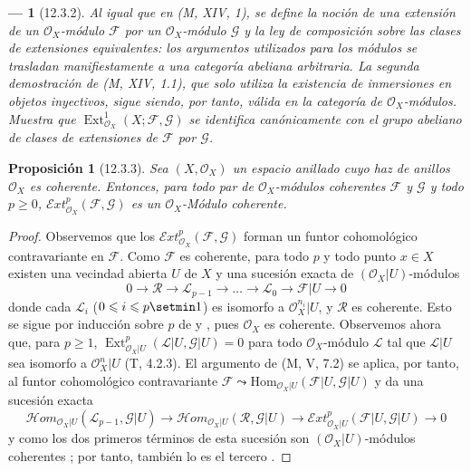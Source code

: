 \documentclass[10pt,oneside,openany]{book}
\theoremstyle{egaenv}\newtheorem*{env}{---}
\theoremstyle{egastatement}
\newtheorem*{proposition}{Proposición}
\theoremstyle{egadescription}
\renewcommand{\leq}{\leqslant}
\renewcommand{\geq}{\geqslant}
\begin{document}
\begin{env}[12.3.2]
\label{0.12.3.2}
\label{0.12.3.2-fr}
Al igual que en (M, XIV, 1), se define la noción de una
\emph{extensión} de un $\mathcal O_X$-módulo $\mathcal F$ por un
$\mathcal O_X$-módulo $\mathcal G$ y la ley de composición sobre las clases de
extensiones equivalentes: los argumentos utilizados para los módulos se
trasladan manifiestamente a una categoría abeliana arbitraria.
La segunda demostración de (M, XIV, 1.1), que solo utiliza la existencia de
inmersiones en objetos inyectivos, sigue siendo, por tanto, válida en la
categoría de $\mathcal O_X$-módulos.  Muestra que
$\operatorname{Ext}_{\mathcal O_X}^1(X;\mathcal F,\mathcal G)$
se identifica canónicamente con el \emph{grupo abeliano de clases de
extensiones de $\mathcal F$ por $\mathcal G$}.
\end{env}

\begin{proposition}[12.3.3]
\label{0.12.3.3}
\label{0.12.3.3-fr}
Sea $(X,\mathcal O_X)$ un espacio anillado cuyo haz de anillos
$\mathcal O_X$ es coherente.
Entonces, para todo par de $\mathcal O_X$-módulos coherentes $\mathcal F$ y
$\mathcal G$ y todo $p\geq0$,
$\mathcal{E}xt_{\mathcal O_X}^p(\mathcal F,\mathcal G)$
es un $\mathcal O_X$-Módulo coherente.
\end{proposition}

\begin{proof}
Observemos que los $\mathcal{E}xt_{\mathcal O_X}^p(\mathcal F,\mathcal G)$ forman un funtor cohomológico
contravariante en $\mathcal F$.
Como $\mathcal F$ es coherente, para todo $p$ y todo punto $x\in X$
existen una vecindad abierta $U$ de $X$ y una sucesión exacta
de $(\mathcal O_X|U)$-módulos
\[
0\longrightarrow\mathcal R\longrightarrow\mathcal L_{p-1}
\longrightarrow\ldots\longrightarrow\mathcal L_0
\longrightarrow\mathcal F|U\longrightarrow0
\]
donde cada $\mathcal L_i$ ($0\leq i\leq p\setmin 1$) es isomorfo a
$\mathcal O_X^{n_i}|U$, y $\mathcal R$ es coherente.
Esto se sigue por inducción sobre $p$ de
 y
, pues $\mathcal O_X$ es coherente. Observemos ahora que, para $p\geq1$,
$\operatorname{Ext}_{\mathcal O_X|U}^p(\mathcal L|U,\mathcal G|U)=0$
para todo $\mathcal O_X$-módulo $\mathcal L$ tal que $\mathcal L|U$ sea
isomorfo a $\mathcal O_X^n|U$ (T, 4.2.3).
El argumento de (M, V, 7.2) se aplica, por tanto, al funtor cohomológico
contravariante
$\mathcal F\leadsto
\mathrm{Hom}_{\mathcal O_X|U}(\mathcal F|U,\mathcal G|U)$
y da una sucesión exacta
\[
\mathcal{H}om_{\mathcal O_X|U}(\mathcal L_{p-1},\mathcal G|U)
\longrightarrow
\mathcal{H}om_{\mathcal O_X|U}(\mathcal R,\mathcal G|U)
\longrightarrow
\mathcal{E}xt_{\mathcal O_X|U}^p(\mathcal F|U,\mathcal G|U)
\longrightarrow0
\] y como los dos primeros términos de esta sucesión son $(\mathcal O_X|U)$-módulos coherentes
; por tanto, también lo es el tercero
.
\end{proof}
\end{document}
